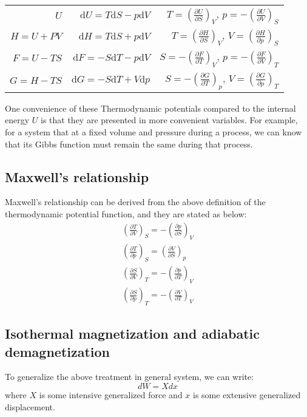 \documentclass{article}
\newcommand{\pfrac}[2]{\frac{\partial #1}{\partial #2}}
\newcommand{\dbar}{d}
\newcommand{\dnor}{\text{d}}
\begin{document}
\begin{table*}
    \centering
    \begin{tabular}{rrr}
        $U$          & $\dnor U =   T \dnor S - p \dnor V$ & $T = \left(\pfrac{U}{S}\right)_V$, $p = -\left(\pfrac{U}{V}\right)_S$ \\
        $H = U + PV$ & $\dnor H =   T \dnor S + p \dnor V$ & $T = \left(\pfrac{H}{S}\right)_V$, $V = \left(\pfrac{H}{p}\right)_S$ \\
        $F = U - TS$ & $\dnor F = - S \dnor T - p \dnor V$ & $S = -\left(\pfrac{F}{T}\right)_V$, $p = -\left(\pfrac{F}{V}\right)_T$ \\
        $G = H - TS$ & $\dnor G = - S \dnor T + V \dnor p$ & $S = -\left(\pfrac{G}{T}\right)_p$, $V = \left(\pfrac{G}{p}\right)_T$ \\
     \end{tabular}
\end{table*}

One convenience of these Thermodynamic potentials compared to the internal energy $U$ is that 
they are presented in more convenient variables. For example, for a system
that at a fixed volume and pressure during a process, we can know that its Gibbs 
function must remain the same during that process.

\subsection*{Maxwell's relationship}
Maxwell's relationship can be derived from the above  definition of the thermodynamic
potential function, and they are stated as below:
\begin{gather}
    \left(\pfrac{T}{V}\right)_S = - \left(\pfrac{p}{S}\right)_V \\
    \left(\pfrac{T}{p}\right)_S = \left(\pfrac{V}{S}\right)_p \\
    \left(\pfrac{S}{V}\right)_T = - \left(\pfrac{p}{T}\right)_V \\
    \left(\pfrac{S}{p}\right)_T = - \left(\pfrac{V}{T}\right)_V 
\end{gather}

\subsection*{Isothermal magnetization and adiabatic demagnetization}
To generalize the above treatment in general system, we can write:
\begin{equation}
    \dbar W = X dx
\end{equation}
where $X$ is some intensive generalized force and $x$ is some 
extensive generalized displacement.
\end{document}

